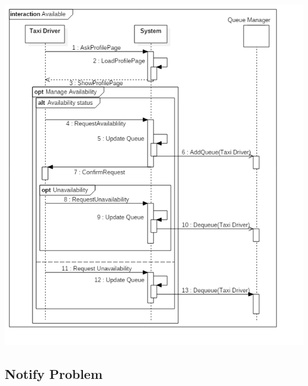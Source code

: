 \documentclass[english]{article}
\begin{document}
\includegraphics[width=\textwidth]{Available}

\subsection{Notify Problem}
\end{document}
